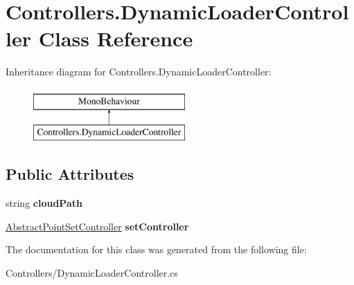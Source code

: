 \hypertarget{class_controllers_1_1_dynamic_loader_controller}{}\section{Controllers.\+Dynamic\+Loader\+Controller Class Reference}
\label{class_controllers_1_1_dynamic_loader_controller}
Inheritance diagram for Controllers.\+Dynamic\+Loader\+Controller\+:\begin{figure}[H]
\begin{center}
\leavevmode
\includegraphics[height=2.000000cm]{class_controllers_1_1_dynamic_loader_controller}
\end{center}
\end{figure}
\subsection*{Public Attributes}
\begin{DoxyCompactItemize}
\item 
\mbox{\label{class_controllers_1_1_dynamic_loader_controller_afe909bbcb95428500b939c911a21ea4a}} 
string {\bfseries cloud\+Path}
\item 
\mbox{\label{class_controllers_1_1_dynamic_loader_controller_a521c29ad1518e963c692df3e462fd168}} 
\hyperlink{class_controllers_1_1_abstract_point_set_controller}{Abstract\+Point\+Set\+Controller} {\bfseries set\+Controller}
\end{DoxyCompactItemize}


The documentation for this class was generated from the following file\+:\begin{DoxyCompactItemize}
\item 
Controllers/Dynamic\+Loader\+Controller.\+cs\end{DoxyCompactItemize}

